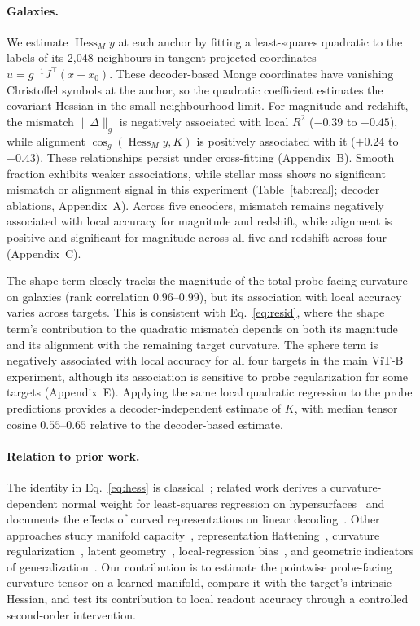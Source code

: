 \documentclass{article}
\begin{document}
\paragraph{Galaxies.}
We estimate $\operatorname{Hess}_M y$ at each
anchor by fitting a least-squares quadratic
to the labels of its 2{,}048 neighbours in
tangent-projected coordinates
$u=g^{-1}J^\top(x-x_0)$. These decoder-based
Monge coordinates have vanishing Christoffel
symbols at the anchor, so the quadratic
coefficient estimates the covariant Hessian
in the small-neighbourhood limit. For
magnitude and redshift, the mismatch
$\|\Delta\|_g$ is negatively associated with
local $R^2$ ($-0.39$ to $-0.45$), while
alignment
$\cos_g(\operatorname{Hess}_M y,K)$
is positively associated with it
($+0.24$ to $+0.43$). These relationships
persist under cross-fitting (Appendix~B).
Smooth fraction exhibits weaker associations,
while stellar mass shows no significant
mismatch or alignment signal in this
experiment (Table~\ref{tab:real}; decoder
ablations, Appendix~A). Across five encoders, mismatch remains negatively associated with local accuracy for magnitude and redshift, while alignment is positive and significant for magnitude across all five and redshift across four (Appendix~C).

The shape term closely tracks the magnitude
of the total probe-facing curvature on
galaxies (rank correlation $0.96$--$0.99$),
but its association with local accuracy
varies across targets. This is consistent
with Eq.~\eqref{eq:resid}, where the shape
term's contribution to the quadratic
mismatch depends on both its magnitude and
its alignment with the remaining target
curvature. The sphere term is negatively
associated with local accuracy for all four
targets in the main ViT-B experiment,
although its association is sensitive to
probe regularization for some targets
(Appendix~E). Applying the same local
quadratic regression to the probe predictions
provides a decoder-independent estimate of
$K$, with median tensor cosine
$0.55$--$0.65$ relative to the
decoder-based estimate.

\paragraph{Relation to prior work.}
The identity in Eq.~\eqref{eq:hess} is
classical~\citep{milnor1963morse,chern1957total};
related work derives a curvature-dependent
normal weight for least-squares regression
on hypersurfaces~\citep{liu2023linear}
and documents the effects of curved
representations on linear
decoding~\citep{jurewicz2024irrational}.
Other approaches study manifold
capacity~\citep{chung2016linear,slatton2026linear},
representation flattening~\citep{psenka2024flattening},
curvature regularization~\citep{ma2023curvature},
latent geometry~\citep{kaufman2023latent},
local-regression bias~\citep{cheng2013local},
and geometric indicators of
generalization~\citep{chou2026diagnosing}.
Our contribution is to estimate the
pointwise probe-facing curvature tensor
on a learned manifold, compare it with
the target's intrinsic Hessian, and test
its contribution to local readout accuracy
through a controlled second-order intervention.
\end{document}
